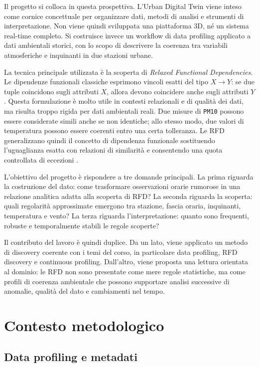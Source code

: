 \documentclass[a4paper,12pt]{article}
\newcommand{\PMdieci}{\texttt{PM10}}
\begin{document}
Il progetto si colloca in questa prospettiva. L'Urban Digital Twin viene inteso come cornice concettuale per organizzare dati, metodi di analisi e strumenti di interpretazione. Non viene quindi sviluppata una piattaforma 3D, né un sistema real-time completo. Si costruisce invece un workflow di data profiling applicato a dati ambientali storici, con lo scopo di descrivere la coerenza tra variabili atmosferiche e inquinanti in due stazioni urbane.

La tecnica principale utilizzata è la scoperta di \textit{Relaxed Functional Dependencies}. Le dipendenze funzionali classiche esprimono vincoli esatti del tipo $X \rightarrow Y$: se due tuple coincidono sugli attributi $X$, allora devono coincidere anche sugli attributi $Y$. Questa formulazione è molto utile in contesti relazionali e di qualità dei dati, ma risulta troppo rigida per dati ambientali reali. Due misure di \PMdieci{} possono essere considerate simili anche se non identiche; allo stesso modo, due valori di temperatura possono essere coerenti entro una certa tolleranza. Le RFD generalizzano quindi il concetto di dipendenza funzionale sostituendo l'uguaglianza esatta con relazioni di similarità e consentendo una quota controllata di eccezioni \cite{rfd-survey}.

L'obiettivo del progetto è rispondere a tre domande principali. La prima riguarda la costruzione del dato: come trasformare osservazioni orarie rumorose in una relazione analitica adatta alla scoperta di RFD? La seconda riguarda la scoperta: quali regolarità approssimate emergono tra stazione, fascia oraria, inquinanti, temperatura e vento? La terza riguarda l'interpretazione: quanto sono frequenti, robuste e temporalmente stabili le regole scoperte?

Il contributo del lavoro è quindi duplice. Da un lato, viene applicato un metodo di discovery coerente con i temi del corso, in particolare data profiling, RFD discovery e continuous profiling. Dall'altro, viene proposta una lettura orientata al dominio: le RFD non sono presentate come mere regole statistiche, ma come profili di coerenza ambientale che possono supportare analisi successive di anomalie, qualità del dato e cambiamenti nel tempo.

\section{Contesto metodologico}

\subsection{Data profiling e metadati}
\end{document}

